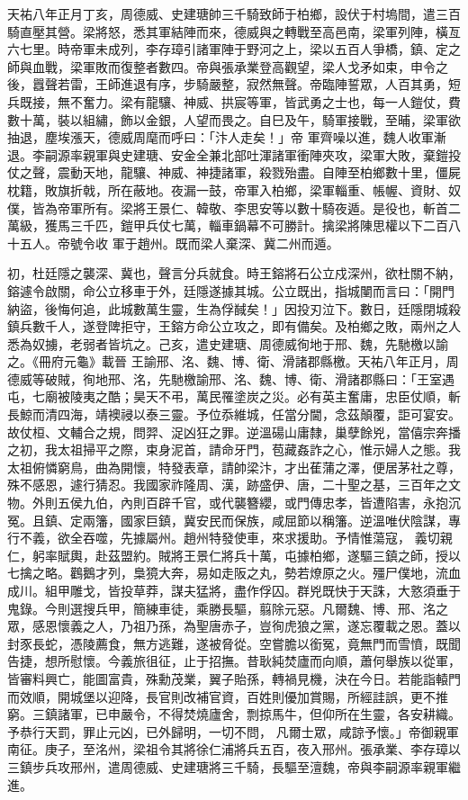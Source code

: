 \begin{pinyinscope}
 天祐八年正月丁亥，周德威、史建瑭帥三千騎致師于柏鄉，設伏于村塢間，遣三百騎直壓其營。梁將怒，悉其軍結陣而來，德威與之轉戰至高邑南，梁軍列陣，橫亙
 六七里。時帝軍未成列，李存璋引諸軍陣于野河之上，梁以五百人爭橋，鎮、定之師與血戰，梁軍敗而復整者數四。帝與張承業登高觀望，梁人戈矛如束，申令之後，囂聲若雷，王師進退有序，步騎嚴整，寂然無聲。帝臨陣誓眾，人百其勇，短兵既接，無不奮力。梁有龍驤、神威、拱宸等軍，皆武勇之士也，每一人鎧仗，費數十萬，裝以組繡，飾以金銀，人望而畏之。自巳及午，騎軍接戰，至晡，梁軍欲抽退，塵埃漲天，德威周麾而呼曰：「汴人走矣！」帝
 軍齊噪以進，魏人收軍漸退。李嗣源率親軍與史建瑭、安金全兼北部吐渾諸軍衝陣夾攻，梁軍大敗，棄鎧投仗之聲，震動天地，龍驤、神威、神捷諸軍，殺戮殆盡。自陣至柏鄉數十里，僵屍枕籍，敗旗折戟，所在蔽地。夜漏一鼓，帝軍入柏鄉，梁軍輜重、帳幄、資財、奴僕，皆為帝軍所有。梁將王景仁、韓敬、李思安等以數十騎夜遁。是役也，斬首二萬級，獲馬三千匹，鎧甲兵仗七萬，輜車鍋幕不可勝計。擒梁將陳思權以下二百八十五人。帝號令收
 軍于趙州。既而梁人棄深、冀二州而遁。



 初，杜廷隱之襲深、冀也，聲言分兵就食。時王鎔將石公立戍深州，欲杜關不納，鎔遽令啟關，命公立移車于外，廷隱遂據其城。公立既出，指城闉而言曰：「開門納盜，後悔何追，此城數萬生靈，生為俘馘矣！」因投刃泣下。數日，廷隱閉城殺鎮兵數千人，遂登陴拒守，王鎔方命公立攻之，即有備矣。及柏鄉之敗，兩州之人悉為奴擄，老弱者皆坑之。己亥，遣史建瑭、周德威徇地于邢、魏，先馳檄以諭之。《冊府元龜》載晉
 王諭邢、洺、魏、博、衛、滑諸郡縣檄。天祐八年正月，周德威等破賊，徇地邢、洺，先馳檄諭邢、洺、魏、博、衛、滑諸郡縣曰：「王室遇屯，七廟被陵夷之酷；昊天不弔，萬民罹塗炭之災。必有英主奮庸，忠臣仗順，斬長鯨而清四海，靖襖祲以泰三靈。予位忝維城，任當分閫，念茲顛覆，詎可宴安。故仗桓、文輔合之規，問羿、浞凶狂之罪。逆溫碭山庸隸，巢孽餘兇，當僖宗奔播之初，我太祖掃平之際，束身泥首，請命牙門，苞藏姦詐之心，惟示婦人之態。我太祖俯憐窮鳥，曲為開懷，特發表章，請帥梁汴，才出萑蒲之澤，便居茅社之尊，殊不感恩，遽行猜忍。我國家祚隆周、漢，跡盛伊、唐，二十聖之基，三百年之文物。外則五侯九伯，內則百辟千官，或代襲簪纓，或門傳忠孝，皆遭陷害，永抱沉冤。且鎮、定兩籓，國家巨鎮，冀安民而保族，咸屈節以稱籓。逆溫唯伏陰謀，專行不義，欲全吞噬，先據屬州。趙州特發使車，來求援助。予情惟蕩寇，
 義切親仁，躬率賦輿，赴茲盟約。賊將王景仁將兵十萬，屯據柏鄉，遂驅三鎮之師，授以七擒之略。鸛鵝才列，梟獍大奔，易如走阪之丸，勢若燎原之火。殭尸僕地，流血成川。組甲雕戈，皆投草莽，謀夫猛將，盡作俘囚。群兇既快于天誅，大憝須垂于鬼錄。今則選搜兵甲，簡練車徒，乘勝長驅，翦除元惡。凡爾魏、博、邢、洺之眾，感恩懷義之人，乃祖乃孫，為聖唐赤子，豈徇虎狼之黨，遂忘覆載之恩。蓋以封豕長蛇，憑陵薦食，無方逃難，遂被脅從。空嘗膽以銜冤，竟無門而雪憤，既聞告捷，想所慰懷。今義旅徂征，止于招撫。昔耿純焚廬而向順，蕭何舉族以從軍，皆審料興亡，能圖富貴，殊勳茂業，翼子貽孫，轉禍見機，決在今日。若能詣轅門而效順，開城堡以迎降，長官則改補官資，百姓則優加賞賜，所經詿誤，更不推窮。三鎮諸軍，已申嚴令，不得焚燒廬舍，剽掠馬牛，但仰所在生靈，各安耕織。予恭行天罰，罪止元凶，已外歸明，一切不問，
 凡爾士眾，咸諒予懷。」帝御親軍南征。庚子，至洺州，梁祖令其將徐仁浦將兵五百，夜入邢州。張承業、李存璋以三鎮步兵攻邢州，遣周德威、史建瑭將三千騎，長驅至澶魏，帝與李嗣源率親軍繼進。




\end{pinyinscope}
